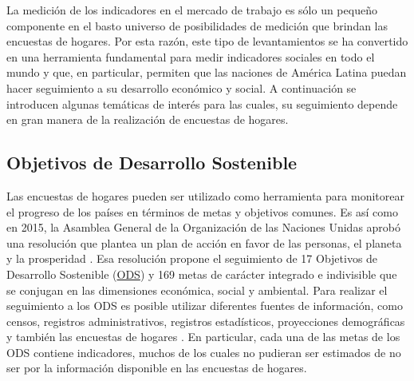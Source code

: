 \documentclass[
  12pt,
  spanish,
]{book}
\begin{document}
La medición de los indicadores en el mercado de trabajo es sólo un pequeño componente en el basto universo de posibilidades de medición que brindan las encuestas de hogares. Por esta razón, este tipo de levantamientos se ha convertido en una herramienta fundamental para medir indicadores sociales en todo el mundo y que, en particular, permiten que las naciones de América Latina puedan hacer seguimiento a su desarrollo económico y social. A continuación se introducen algunas temáticas de interés para las cuales, su seguimiento depende en gran manera de la realización de encuestas de hogares.

\hypertarget{objetivos-de-desarrollo-sostenible}{%
\subsection*{Objetivos de Desarrollo Sostenible}\label{objetivos-de-desarrollo-sostenible}}

Las encuestas de hogares pueden ser utilizado como herramienta para monitorear el progreso de los países en términos de metas y objetivos comunes. Es así como en 2015, la Asamblea General de la Organización de las Naciones Unidas aprobó una resolución que plantea un plan de acción en favor de las personas, el planeta y la prosperidad \citep{United_Nations_2015}. Esa resolución propone el seguimiento de 17 Objetivos de Desarrollo Sostenible (\href{https://sustainabledevelopment.un.org}{ODS}) y 169 metas de carácter integrado e indivisible que se conjugan en las dimensiones económica, social y ambiental. Para realizar el seguimiento a los ODS es posible utilizar diferentes fuentes de información, como censos, registros administrativos, registros estadísticos, proyecciones demográficas y también las encuestas de hogares \citep{United_Nations_2016}. En particular, cada una de las metas de los ODS contiene indicadores, muchos de los cuales no pudieran ser estimados de no ser por la información disponible en las encuestas de hogares.
\end{document}
